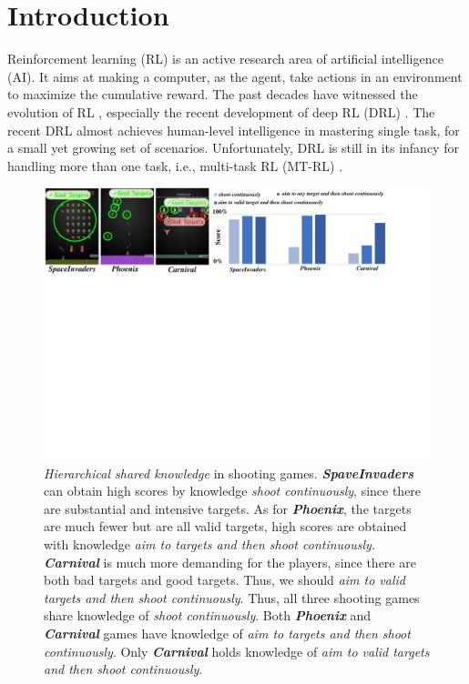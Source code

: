 \documentclass[letterpaper]{article} %
\begin{document}
\section{Introduction}
Reinforcement learning (RL) is an active research area of artificial intelligence (AI). It aims at making a computer, as the agent, take actions in an environment to maximize the cumulative reward. The past decades have witnessed the evolution of RL \cite{sutton1998reinforcement}, especially the recent development of deep RL (DRL) \cite{mnih2015human}. The recent DRL almost achieves human-level intelligence in mastering single task, for a small yet growing set of scenarios. Unfortunately, DRL is still in its infancy for handling more than one task, i.e., multi-task RL (MT-RL) \cite{caruana1998multitask}.

\begin{figure}[ht]
	\begin{center}
		\centerline{\includegraphics[width=\columnwidth]{figure/csfg2}}%
		\caption{\textit{Hierarchical shared knowledge} in shooting games. \textbf{\textit{SpaveInvaders}} can obtain high scores by knowledge \textit{shoot continuously}, since there are substantial and intensive targets. As for \textbf{\textit{Phoenix}}, the targets are much fewer but are all valid targets, high scores are obtained with knowledge \textit{aim to targets and then shoot continuously}. \textbf{\textit{Carnival}} is much more demanding for the players, since there are both bad targets and good targets. Thus, we should \textit{aim to valid targets and then shoot continuously}. Thus, all three shooting games share knowledge of \textit{shoot continuously}. Both \textbf{\textit{Phoenix}} and \textbf{\textit{Carnival}} games have knowledge of \textit{aim to targets and then shoot continuously}. Only \textbf{\textit{Carnival}} holds knowledge of \textit{aim to valid targets and then shoot continuously}.}
		\label{shoot}
	\end{center}
\end{figure}
\end{document}
